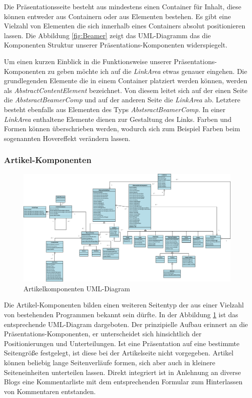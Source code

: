\documentclass[12pt]{article}
\begin{document}
Die Präsentationsseite besteht aus mindestens einen Container für Inhalt, diese können entweder aus Containern oder aus Elementen bestehen.
Es gibt eine Vielzahl von Elementen die sich innerhalb eines Containers absolut positionieren lassen. Die Abbildung \ref{fig:Beamer} zeigt
das UML-Diagramm das die Komponenten Struktur unserer Präsentations-Komponenten widerspiegelt. 

Um einen kurzen Einblick in die Funktionsweise unserer Präsentations-Komponenten zu geben möchte ich auf die \textit{LinkArea} etwas genauer eingehen. 
Die grundlegenden Elemente die in einem Container platziert werden können, werden als \textit{AbstractContentElement} bezeichnet. Von diesem leitet sich auf der einen Seite die \textit{AbstsractBeamerComp} und auf der anderen Seite die \textit{LinkArea} ab. 
Letztere besteht ebenfalls aus Elementen des Typs \textit{AbstsractBeamerComp}. 
In einer \textit{LinkArea} enthaltene Elemente dienen zur Gestaltung des Links. Farben und Formen
können überschrieben werden, wodurch sich zum Beispiel Farben beim sogenannten Hovereffekt verändern lassen.

\subsubsection{Artikel-Komponenten}

\begin{figure}[h]
	\centering
	\includegraphics[width=1.0\textwidth]{Artikel.png}
	\caption{Artikelkomponenten UML-Diagram}
	\label{fig:Artikel}
\end{figure}

Die Artikel-Komponenten bilden einen weiteren Seitentyp der aus einer Vielzahl von bestehenden Programmen
bekannt sein dürfte. In der Abbildung \ref{fig:Artikel} ist das entsprechende UML-Diagram dargeboten.
Der prinzipielle Aufbau erinnert an die Präsentations-Komponenten, er unterscheidet sich hinsichtlich
der Positionierungen und Unterteilungen. Ist eine Präsentation auf eine bestimmte Seitengröße festgelegt, ist diese bei der Artikelseite
nicht vorgegeben. Artikel können beliebig lange Seitenverläufe formen, sich aber auch in kleinere Seiteneinheiten unterteilen lassen.
Direkt integriert ist in Anlehnung an diverse Blogs eine Kommentarliste mit dem entsprechenden Formular zum Hinterlassen
von Kommentaren entstanden.
\end{document}
